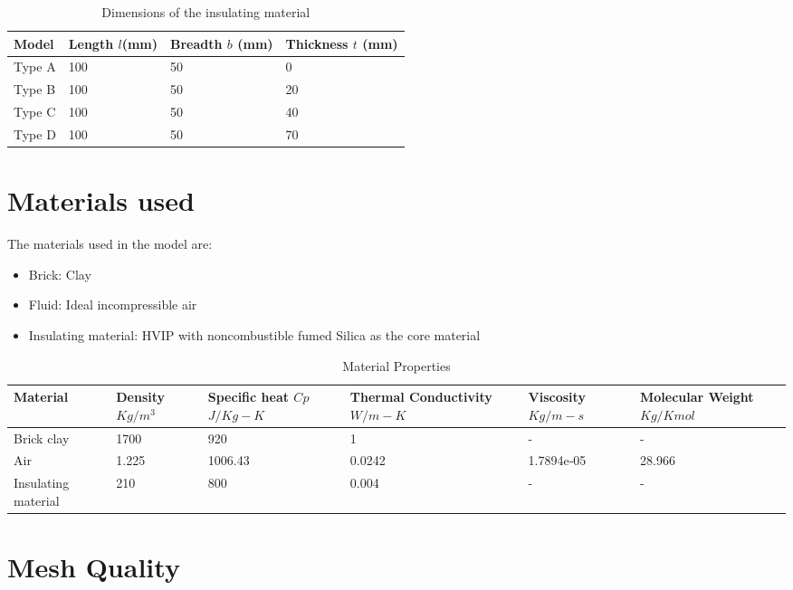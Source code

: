 \documentclass{article}
\begin{document}
\begin{table}[H]
\begin{center}
\caption{Dimensions of the insulating material} 
\begin{tabular}{llll}
\hline
 Model  & Length $l$(mm) & Breadth $b$ (mm) & Thickness $t$ (mm) \\
\hline
Type A  & 100 & 50 & 0 \\
Type B  & 100 & 50 & 20 \\
Type C  & 100 & 50 & 40 \\
Type D  & 100 & 50 & 70 \\
\hline 
\end{tabular}
\end{center}
\end{table}


\section{Materials used}
The materials used in the model are:
\begin{itemize}
\item Brick: Clay
\item Fluid: Ideal incompressible air
\item Insulating material: HVIP  with noncombustible fumed Silica as the core material
\end{itemize}


\begin{table}[H]
\begin{center}
\caption{Material Properties }
\begin{tabular}{lp{2.3cm}p{2.3cm}p{2.3cm}p{2.3cm}p{2.3cm}}
\hline
Material  & Density $Kg/m^3$  &Specific heat $Cp$ $J/Kg-K$ & Thermal Conductivity $W/m-K$ & Viscosity $Kg/m-s$ & Molecular Weight $Kg/Kmol$ \\
\hline
Brick clay  & 1700 & 920 & 1 & -  & - \\
Air  & 1.225 & 1006.43  & 0.0242 & 1.7894e‐05 & 28.966  \\
Insulating material   & 210 & 800 & 0.004 &- & -  \\
\hline 
\end{tabular}
\end{center}
\end{table}










\section{Mesh Quality}
\end{document}
